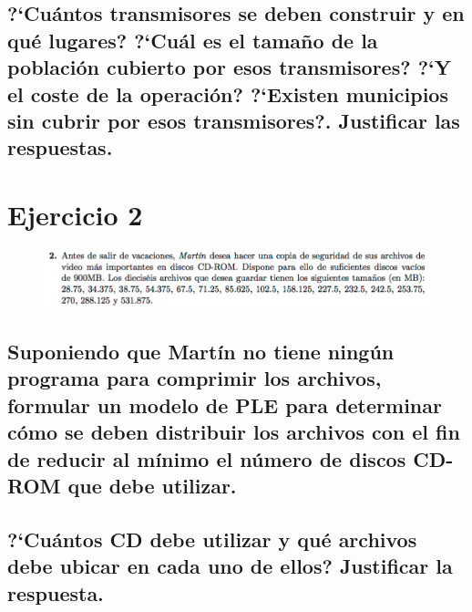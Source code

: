 \documentclass[10pt, a4paper]{article}
\begin{document}
		\subsection{?`Cuántos transmisores se deben construir y en qué lugares? ?`Cuál es el tamaño de la población cubierto por esos transmisores? ?`Y el coste de la operación? ?`Existen municipios sin cubrir por esos transmisores?. Justificar las respuestas.}

			\paragraph{}


	\section{Ejercicio 2}

        \begin{figure}[H]
        \centering
            \includegraphics[width=\textwidth]{res/exercise-2.png}
        \end{figure}


		\subsection{Suponiendo que Martín no tiene ningún programa para comprimir los archivos, formular un modelo de PLE para determinar cómo se deben distribuir los archivos con el fin de reducir al mínimo el número de discos CD-ROM que debe utilizar.}

			\paragraph{}

		\subsection{?`Cuántos CD debe utilizar y qué archivos debe ubicar en cada uno de ellos? Justificar la respuesta.}
\end{document}
